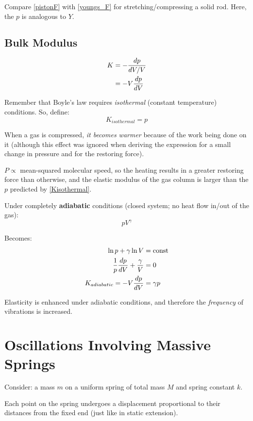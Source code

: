 \documentclass[11pt,letterpaper,titlepage,oneside]{book}
\begin{document}
Compare \eqref{pistonF} with \eqref{youngs_F} for stretching/compressing a solid rod. Here, the $p$ is analogous to $Y$.

\subsection{Bulk Modulus}
\begin{align}
K &= -\frac{dp}{dV/V} \notag \\
&= -V\frac{dp}{dV}
\end{align}

Remember that Boyle's law requires \emph{isothermal} (constant temperature) conditions. So, define: \begin{equation} K_{isothermal} = p \label{Kisothermal} \end{equation} 
 
When a gas is compressed, \textit{it becomes warmer} because of the work being done on it (although this effect was ignored when deriving the expression for a small change in pressure and for the restoring force).

$P \propto$ mean-squared molecular speed, so the heating results in a greater restoring force than otherwise, and the elastic modulus of the gas column is larger than the $p$ predicted by \eqref{Kisothermal}.

Under completely \textbf{adiabatic} conditions (closed system; no heat flow in/out of the gas):
\begin{equation} pV^\gamma \end{equation}

Becomes:
\begin{align}
\ln p + \gamma\ln V &= \text{const} \notag \\
\frac{1}{p}\frac{dp}{dV} + \frac{\gamma}{V} &= 0 \notag \\
K_{adiabatic} = -V \frac{dp}{dV} &= \gamma p \label{Kadiabatic}
\end{align}

Elasticity is enhanced under adiabatic conditions, and therefore the \textit{frequency} of vibrations is increased.

\section{Oscillations Involving Massive Springs}
Consider: a mass $m$ on a uniform spring of total mass $M$ and spring constant $k$.

Each point on the spring undergoes a displacement proportional to their distances from the fixed end (just like in static extension).
\end{document}
